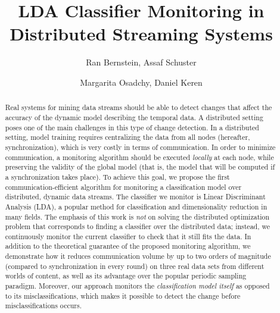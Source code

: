 \documentclass[sigconf]{acmart}
\begin{document}
\title{LDA Classifier Monitoring in Distributed Streaming Systems} 
\author{Ran Bernstein, Assaf Schuster}
  
\author{Margarita Osadchy, Daniel Keren}

\begin{abstract}
Real systems for mining data streams should be able to detect changes that affect the accuracy of the dynamic model describing the temporal data. A distributed setting poses one of the main challenges in this type of change detection. In a distributed setting, model training requires centralizing the data from all nodes (hereafter, synchronization), which is very costly in terms of communication. In order to minimize communication, a monitoring algorithm should be executed \emph{locally} at each node,
while preserving the validity of the global model (that is, the model that will be computed if a synchronization takes place). To achieve this goal, we propose the first communication-efficient algorithm for monitoring a classification model over distributed, dynamic data streams. The classifier we monitor is Linear Discriminant Analysis (LDA), a popular method for classification and dimensionality reduction in many fields.  The emphasis of this work is \emph{not} on solving the distributed optimization problem
that corresponds to finding a classifier over the distributed data; instead, we continuously
monitor the current classifier to check that it still fits the data. In addition to the theoretical guarantee of the proposed monitoring algorithm, we demonstrate how it reduces communication volume by up to two orders of magnitude (compared to synchronization in every round) on three real data sets from different worlds of content, as well as its advantage over the
popular periodic sampling paradigm. Moreover, our approach monitors the \emph{classification model itself} as opposed to its misclassifications, which makes it possible to detect the change before misclassifications occurs.
\end{abstract}
\end{document}
